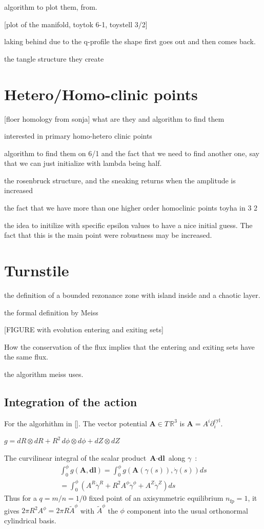 algorithm to plot them, from.

[plot of the manifold, toytok 6-1, toystell 3/2]

laking behind due to the q-profile
the shape first goes out and then comes back.

the tangle structure they create

\section{Hetero/Homo-clinic points}
[floer homology from sonja]
what are they and algorithm to find them

interested in primary homo-hetero clinic points

algorithm to find them on 6/1 and the fact that we need to find another one, say that we can just initialize with lambda being half.

the rosenbruck structure, and the sneaking returns when the amplitude is increased

the fact that we have more than one
higher order homoclinic points
toyha in 3 2 

the idea to initilize with specific epsilon values to have a nice initial guess. The fact that this is the main point were robustness may be increased.

\section{Turnstile}

the definition of a bounded rezonance zone with island inside and a chaotic layer.

the formal definition by Meiss

[FIGURE with evolution entering and exiting sets]

How the conservation of the flux implies that the entering and exiting sets have the same flux.

the algorithm meiss uses.

\subsection{Integration of the action}

For the algorhithm in []. The vector potential $\textbf{A} \in T\,\mathbb{R}^3$ is $\textbf{A} =  A^i\partial_i^\text{cyl}$.

$g = dR\otimes dR + R^2\,d\phi\otimes d\phi + dZ\otimes dZ$

The curvilinear integral of the scalar product $\textbf{A}\cdot\textbf{dl}$ along $\gamma$~:
\begin{align*}
    \int_0^\phi g(\textbf{A},\textbf{dl}) = \int_0^\phi g(\textbf{A}(\gamma(s)),\dot{\gamma}(s))ds\\ = \int_0^\phi (A^R\dot{\gamma}^R + R^2A^\phi\dot{\gamma}^\phi + A^Z\dot{\gamma}^Z) ds
\end{align*}
Thus for a $q=m/n=1/0$ fixed point of an axisymmetric equilibrium $n_\text{fp} = 1$, it gives $2\pi R^2A^\phi = 2\pi R\tilde{A}^\phi$ with $\tilde{A}^\phi$ the $\phi$ component into the usual orthonormal cylindrical basis.

